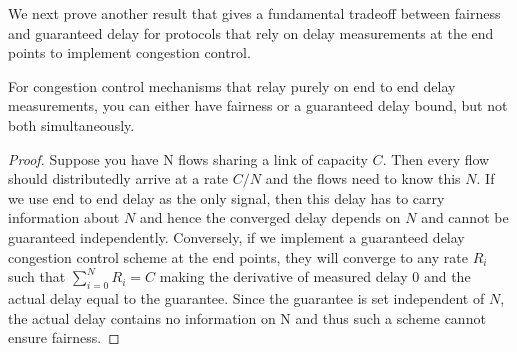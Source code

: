 We next prove another result that gives a fundamental tradeoff between
fairness and guaranteed delay for protocols that
rely on delay measurements at the end points to implement congestion
control.
\begin{thm}
For congestion control mechanisms that relay purely on end to end
delay measurements, you can either have fairness or a guaranteed delay
bound, but not both simultaneously.
\end{thm}
\begin{proof}
Suppose you have N flows sharing a link of capacity $C$. Then every flow
should distributedly arrive at a rate $C/N$ and the flows need to know
this $N$. If we use end to end delay as the only signal, then this delay
has to carry information about $N$ and hence the converged delay
depends on $N$ and cannot be guaranteed independently. Conversely, if we implement a guaranteed delay congestion
control scheme at the end points, they
will converge to any rate $R_i$ such that $\sum_{i=0}^{N}R_i = C$
making the derivative of measured delay 0 and the actual delay equal
to the guarantee. Since the guarantee is set independent of $N$, the
actual delay contains no information on N and 
thus such a scheme cannot ensure fairness.
\end{proof}



